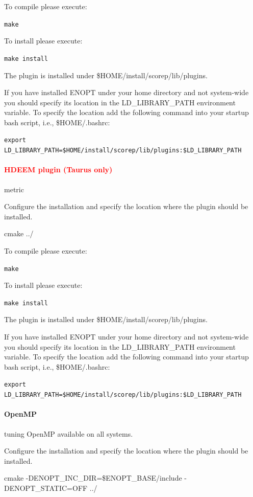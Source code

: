 \documentclass[11pt,a4paper, oneside]{book} %
\newcommand{\installloc}[1]{\$HOME/install/#1}
\begin{document}

To compile please execute:

\texttt{make}

To install please execute:

\texttt{make install}

The plugin is installed under \installloc{scorep/lib/plugins}.

If you have installed ENOPT under your home directory and not system-wide you
should specify its location in the LD\_LIBRARY\_PATH environment variable. To
specify the location add the following command into your startup bash script,
i.e., \$HOME/.bashrc:

\texttt{export LD\_LIBRARY\_PATH=\installloc{scorep/lib/plugins}:\$LD\_LIBRARY\_PATH}

\paragraph{\textcolor{red}{HDEEM plugin (Taurus only)}} metric

Configure the installation and specify the location where the plugin should be
installed.

cmake ../

To compile please execute:

\texttt{make}

To install please execute:

\texttt{make install}

The plugin is installed under \installloc{scorep/lib/plugins}.

If you have installed ENOPT under your home directory and not system-wide you
should specify its location in the LD\_LIBRARY\_PATH environment variable. To
specify the location add the following command into your startup bash script,
i.e., \$HOME/.bashrc:

\texttt{export LD\_LIBRARY\_PATH=\installloc{scorep/lib/plugins}:\$LD\_LIBRARY\_PATH}

\paragraph{OpenMP} tuning
OpenMP available on all systems.

Configure the installation and specify the location where the plugin should be
installed.

cmake -DENOPT\_INC\_DIR=\$ENOPT\_BASE/include -DENOPT\_STATIC=OFF ../
\end{document}
